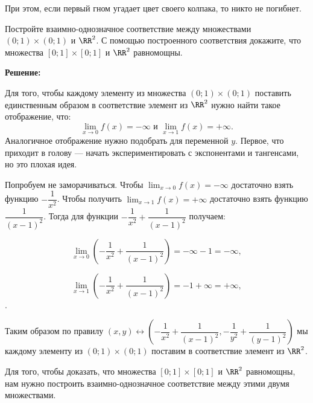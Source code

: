 \documentclass[12pt, a4paper, oneside]{article}
\begin{document}
При этом, если первый гном угадает цвет своего колпака, то никто не погибнет.



\begin{problem}{}
Постройте взаимно-однозначное соответствие между множествами $(0;1) \times (0;1)$ и $\RR^{2}$. С помощью построенного соответствия докажите, что множества $[0;1] \times [0;1]$ и $\RR^{2}$ равномощны.
\end{problem}

\textbf{Решение:}

Для того, чтобы каждому элементу из множества $(0;1) \times (0;1)$ поставить единственным образом в соответствие элемент из $\RR^{2}$ нужно найти такое отображение, что:
\[ \lim_{x \to 0} f(x) = - \infty \text{ и } \lim_{x \to 1} f(x) = + \infty.\] Аналогичное отображение нужно подобрать для переменной $y$. Первое, что приходит в голову --- начать экспериментировать с экспонентами и тангенсами, но это плохая идея.

Попробуем не заморачиваться. Чтобы $\lim_{x \to 0} f(x) = - \infty$ достаточно взять функцию $-\dfrac{1}{x^2}$. Чтобы получить  $\lim_{x \to 1} f(x) = + \infty$ достаточно взять функцию $\dfrac{1}{(x-1)^2}$. Тогда для функции $-\dfrac{1}{x^2} + \dfrac{1}{(x-1)^2}$ получаем:

\[\lim_{x \to 0} \left(-\frac{1}{x^2} + \dfrac{1}{(x-1)^2}\right) = -\infty -1 = -\infty,\]

\[\lim_{x \to 1} \left(-\frac{1}{x^2} + \dfrac{1}{(x-1)^2}\right) = -1 + \infty = +\infty,\].

Таким образом по правилу $(x,y) \leftrightarrow \left(-\dfrac{1}{x^2} + \dfrac{1}{(x-1)^2},-\dfrac{1}{y^2} + \dfrac{1}{(y-1)^2}\right)$ мы каждому элементу из $(0;1) \times (0;1)$ поставим в соответствие элемент из $\RR^{2}$.

Для того, чтобы доказать, что множества $[0;1] \times [0;1]$ и $\RR^{2}$ равномощны, нам нужно построить взаимно-однозначное соответствие между этими двумя множествами.
\end{document}
